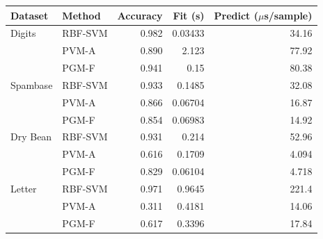 \begin{tabular}{llrrr}
\toprule
Dataset & Method & Accuracy & Fit (s) & Predict ($\mu$s/sample) \\
\midrule
Digits & RBF-SVM & 0.982 & 0.03433 & 34.16 \\
 & PVM-A & 0.890 & 2.123 & 77.92 \\
 & PGM-F & 0.941 & 0.15 & 80.38 \\
\addlinespace
Spambase & RBF-SVM & 0.933 & 0.1485 & 32.08 \\
 & PVM-A & 0.866 & 0.06704 & 16.87 \\
 & PGM-F & 0.854 & 0.06983 & 14.92 \\
\addlinespace
Dry Bean & RBF-SVM & 0.931 & 0.214 & 52.96 \\
 & PVM-A & 0.616 & 0.1709 & 4.094 \\
 & PGM-F & 0.829 & 0.06104 & 4.718 \\
\addlinespace
Letter & RBF-SVM & 0.971 & 0.9645 & 221.4 \\
 & PVM-A & 0.311 & 0.4181 & 14.06 \\
 & PGM-F & 0.617 & 0.3396 & 17.84 \\
\bottomrule
\end{tabular}
